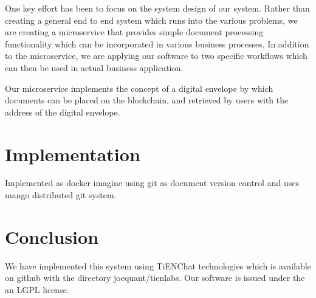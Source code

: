 \documentclass[journal]{IEEEtran}
\begin{document}
One key effort has been to focus on the system design of our system.
Rather than creating a general end to end system which runs into the
various problems, we are creating a microservice that provides simple
document processing functionality which can be incorporated in various
business processes.  In addition to the microservice, we are applying
our software to two specific workflows which can then be used in
actual business application.

Our microservice implements the concept of a digital envelope by which
documents can be placed on the blockchain, and retrieved by users with
the address of the digital envelope.

\section{Implementation}

Implemented as docker imagine using git as document version control
and uses mango distributed git system.  

\section{Conclusion}
We have implemented this system using TiENChat technologies which is
available on github with the directory joequant/tienlabs.  Our
software is issued under the an LGPL license.



\end{document}
